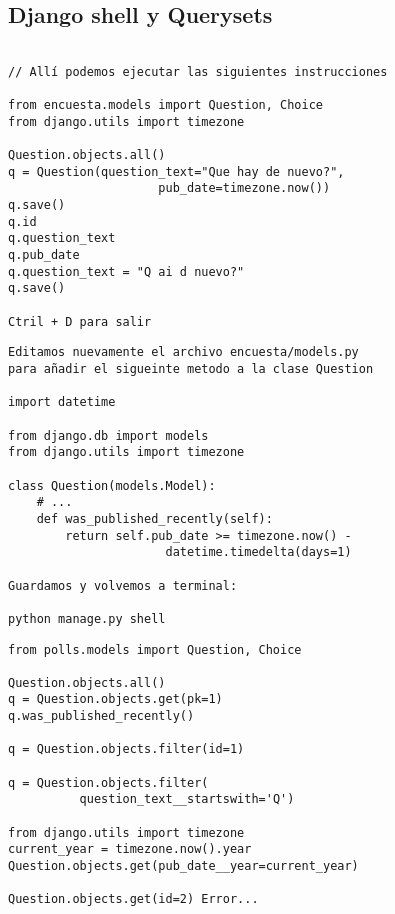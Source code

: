 \documentclass[xcolor=dvipsnames]{beamer}
\begin{document}
\subsection{Django shell y Querysets}
\begin{frame}[fragile]
\begin{verbatim}

// Allí podemos ejecutar las siguientes instrucciones

from encuesta.models import Question, Choice
from django.utils import timezone

Question.objects.all()
q = Question(question_text="Que hay de nuevo?", 
                     pub_date=timezone.now())
q.save()
q.id
q.question_text
q.pub_date
q.question_text = "Q ai d nuevo?"
q.save()

Ctril + D para salir
\end{verbatim}
\end{frame}

\begin{frame}[fragile]
\begin{verbatim}
Editamos nuevamente el archivo encuesta/models.py 
para añadir el sigueinte metodo a la clase Question

import datetime

from django.db import models
from django.utils import timezone

class Question(models.Model):
    # ...
    def was_published_recently(self):
        return self.pub_date >= timezone.now() -
                      datetime.timedelta(days=1)

Guardamos y volvemos a terminal:

python manage.py shell

\end{verbatim}
\end{frame}

\begin{frame}[fragile]
\begin{verbatim}
from polls.models import Question, Choice

Question.objects.all()
q = Question.objects.get(pk=1)
q.was_published_recently()

q = Question.objects.filter(id=1)

q = Question.objects.filter(
          question_text__startswith='Q')

from django.utils import timezone
current_year = timezone.now().year
Question.objects.get(pub_date__year=current_year)

Question.objects.get(id=2) Error...
\end{verbatim}
\end{frame}
\end{document}
